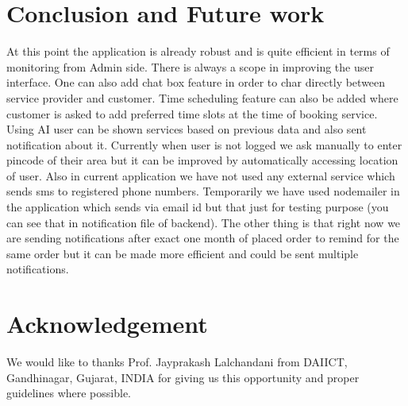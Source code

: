 \documentclass[conference]{IEEEtran}
\begin{document}
\section{Conclusion and Future work}
At this point the application is already robust and is quite efficient in terms of monitoring from Admin side. There is always a scope in improving the user interface. One can also add chat box feature in order to char directly between service provider and customer. Time scheduling feature can also be added where customer is asked to add preferred time slots at the time of booking service. Using AI user can be shown services based on previous data and also sent notification about it. Currently when user is not logged we ask manually to enter pincode of their area but it can be improved by automatically accessing location of user. Also in current application we have not used any external service which sends sms to registered phone numbers. Temporarily we have used nodemailer in the application which sends via email id but that just for testing purpose (you can see that in notification file of backend). The other thing is that right now we are sending notifications after exact one month of placed order to remind for the same order but it can be made more efficient and could be sent multiple notifications.






\vspace{1cm}
\section{Acknowledgement}
We would like to thanks Prof. Jayprakash Lalchandani from DAIICT, Gandhinagar, Gujarat, INDIA for giving us this opportunity and proper guidelines where possible. 
\end{document}
